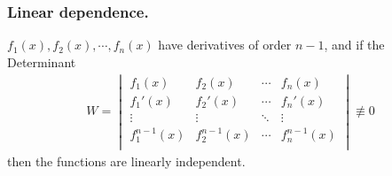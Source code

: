 \documentclass[../main.tex]{subfiles}
\begin{document}
\subsubsection{Linear dependence.} 
$f_1(x), f_2(x),\cdots, f_n(x)$ have derivatives of order $n - 1$, and if the Determinant
\begin{align*}
	W=\begin{vmatrix}
		  f_1(x)       & f_2(x)       & \cdots & f_n(x)       \\
		  f_1'(x)      & f_2'(x)      & \cdots & f_n'(x)      \\
		  \vdots       & \vdots       & \ddots & \vdots       \\
		  f_1^{n-1}(x) & f_2^{n-1}(x) & \cdots & f_n^{n-1}(x) \\
	  \end{vmatrix}\not\equiv0
\end{align*}then the functions are linearly independent.
\end{document}
